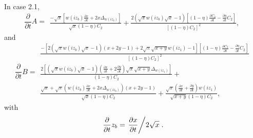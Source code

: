 In case 2.1,
\begin{equation}
\frac{\partial}{\partial t}A =
\begin{array}{l}
 \frac{-\sqrt{\pi} \left[w(iz_b)  \frac{\partial x}{\partial t} + 2 x \Delta_{w(iz_b)}\right]}{\sqrt{x} (1-\eta)C_2} + 
 \frac{2 (\sqrt{\pi} w(iz_b) \sqrt{x} - 1) \left[(1-\eta)\frac{\partial C_2}{\partial t} - \frac{\partial \eta}{\partial t}C_2\right]}
 {\left[(1-\eta)C_2\right]^2},
\end{array}
\end{equation}
and
\begin{equation}
 \frac{\partial}{\partial t} B =
 \begin{array}{l}
  \frac{-\left[2 \left(\sqrt{\pi} w(iz_b) \sqrt{x} - 1\right) (x + 2 y - 1) + 2 \sqrt{\pi} \sqrt{x+y} w(iz_1) - 1\right] \left[(1-\eta)\frac{\partial C_2}{\partial t} - \frac{\partial \eta}{\partial t}C_2\right]}
  {\left[(1-\eta)C_2\right]^2}
  \\[5pt]
  \frac{2\left[\left(\sqrt{\pi} w(iz_b) \sqrt{x} - 1\right) \left(\frac{\partial x}{\partial t} + 2 \frac{\partial y}{\partial t}\right)
                     \sqrt{\pi} \sqrt{x+y} \Delta_{w(iz_1)}\right]
                    }{(1-\eta)C_2} + \\[5pt]
  \frac{\sqrt{x} +
                \sqrt{\pi} \left(w(iz_b) \frac{\partial x}{\partial t} + 2x \Delta_{w(iz_b)}\right) \left(x + 2 y - 1\right)}
  {\sqrt{x}(1-\eta)C_2} + \frac{\sqrt{\pi} \left(\frac{\partial x}{\partial t} + \frac{\partial y}{\partial t}\right) w(iz_1)}{\sqrt{x+y}(1-\eta)C_2},
 \end{array}
\end{equation}
with
\begin{equation}
 \frac{\partial}{\partial t} z_b = \left.\frac{\partial x}{\partial t}\middle/2\sqrt{x}\right..
\end{equation}

